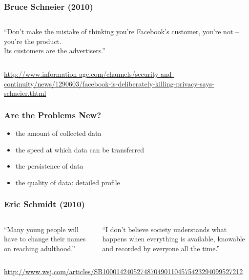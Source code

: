 \documentclass[dvipsnames]{beamer}
\theoremstyle{definition}
\theoremstyle{example}
\theoremstyle{plain}
\begin{document}
\begin{frame}
  \frametitle{Bruce Schneier (2010)}

  \begin{columns}

    ``Don't make the mistake of thinking you're Facebook's customer, you're not
      -- you're the product.\\
      Its customers are the advertisers.''
  \end{columns}

  \medskip
  \tiny{\url{http://www.information-age.com/channels/security-and-continuity/news/1290603/facebook-is-deliberately-killing-privacy-says-schneier.thtml}}\\
\end{frame}

\begin{frame}
  \frametitle{Are the Problems New?}

  \begin{itemize}
    \item the amount of collected data
    \item the speed at which data can be transferred
    \item the persistence of data
    \item the quality of data: detailed profile
  \end{itemize}
\end{frame}

\begin{frame}
  \frametitle{Eric Schmidt (2010)}

  \begin{columns}

    ``Many young people will have to change their names on reaching adulthood.''

    \pause
    \medskip
    ``I don't believe society understands what happens when everything is
      available, knowable and recorded by everyone all the time.''
  \end{columns}

  \medskip
  \tiny{\url{http://www.wsj.com/articles/SB10001424052748704901104575423294099527212}}\\
\end{frame}
\end{document}
